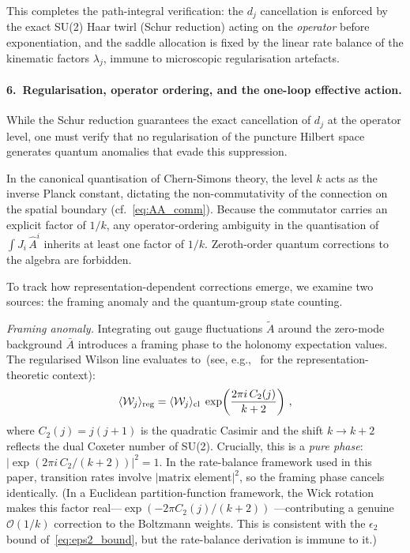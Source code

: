 \documentclass[aps,prd,twocolumn,10pt,superscriptaddress,nofootinbib]{revtex4-2}
\begin{document}
This completes the path-integral verification: the $d_j$
cancellation is enforced by the exact SU(2) Haar twirl (Schur
reduction) acting on the \emph{operator} before exponentiation,
and the saddle allocation is fixed by the linear rate balance of
the kinematic factors $\lambda_j$, immune to microscopic
regularisation artefacts.

\paragraph{6.\ Regularisation, operator ordering, and the
one-loop effective action.}

While the Schur reduction guarantees the exact cancellation of
$d_j$ at the operator level, one must verify that no
regularisation of the puncture Hilbert space generates quantum
anomalies that evade this suppression.

In the canonical quantisation of Chern-Simons theory, the level
$k$ acts as the inverse Planck constant, dictating the
non-commutativity of the connection on the spatial boundary
(cf.~\eqref{eq:AA_comm}).  Because the commutator carries an
explicit factor of $1/k$, any operator-ordering ambiguity in the
quantisation of $\int J_i\,\hat{A}^i$ inherits at least one
factor of $1/k$.  Zeroth-order quantum corrections to the algebra
are forbidden.

To track how representation-dependent corrections emerge, we
examine two sources: the framing anomaly and the quantum-group
state counting.

\emph{Framing anomaly.}  Integrating out gauge fluctuations
$\tilde{A}$ around the zero-mode background $\bar{A}$
introduces a framing phase to the holonomy expectation values.
The regularised Wilson line evaluates
to~(see, e.g.,~\cite{Hall2015} for the representation-theoretic
context):
\begin{equation}
\langle \mathcal{W}_j \rangle_{\rm reg}
  = \langle \mathcal{W}_j \rangle_{\rm cl}\;
    \exp\!\left(\frac{2\pi i\,C_2(j)}{k+2}\right)\,,
\label{eq:framing_anomaly}
\end{equation}
where $C_2(j) = j(j+1)$ is the quadratic Casimir and the shift
$k \to k+2$ reflects the dual Coxeter number of SU(2).  Crucially,
this is a \emph{pure phase}: $|\exp(2\pi i\,C_2/(k+2))|^2 = 1$.
In the rate-balance framework used in this paper, transition rates
involve $|\text{matrix element}|^2$, so the framing phase cancels
identically.  (In a Euclidean partition-function framework, the
Wick rotation makes this factor real---$\exp(-2\pi C_2(j)/(k+2))$
---contributing a genuine $\mathcal{O}(1/k)$ correction to the
Boltzmann weights.  This is consistent with the $\epsilon_2$
bound of~\eqref{eq:eps2_bound}, but the rate-balance derivation
is immune to it.)
\end{document}
